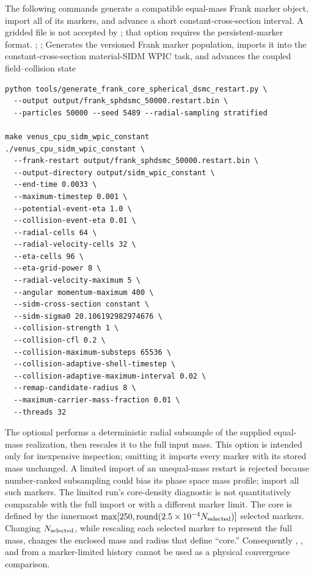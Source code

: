 The following commands generate a compatible equal-mass Frank marker object,
import all of its markers, and advance a short constant-cross-section
interval.  A gridded  file is not accepted by
; that option requires the persistent-marker
 format.
{;
 ;
 }
{Generates the versioned Frank marker population, imports it into the
 constant-cross-section material-SIDM WPIC task, and advances the coupled
 field--collision state}
\begin{lstlisting}
python tools/generate_frank_core_spherical_dsmc_restart.py \
  --output output/frank_sphdsmc_50000.restart.bin \
  --particles 50000 --seed 5489 --radial-sampling stratified

make venus_cpu_sidm_wpic_constant
./venus_cpu_sidm_wpic_constant \
  --frank-restart output/frank_sphdsmc_50000.restart.bin \
  --output-directory output/sidm_wpic_constant \
  --end-time 0.0033 \
  --maximum-timestep 0.001 \
  --potential-event-eta 1.0 \
  --collision-event-eta 0.01 \
  --radial-cells 64 \
  --radial-velocity-cells 32 \
  --eta-cells 96 \
  --eta-grid-power 8 \
  --radial-velocity-maximum 5 \
  --angular momentum-maximum 400 \
  --sidm-cross-section constant \
  --sidm-sigma0 20.106192982974676 \
  --collision-strength 1 \
  --collision-cfl 0.2 \
  --collision-maximum-substeps 65536 \
  --collision-adaptive-shell-timestep \
  --collision-adaptive-maximum-interval 0.02 \
  --remap-candidate-radius 8 \
  --maximum-carrier-mass-fraction 0.01 \
  --threads 32
\end{lstlisting}
The optional  performs a deterministic radial subsample
of the supplied equal-mass realization, then rescales it to
the full input mass.  This option is intended only for inexpensive inspection;
omitting it imports every marker with its
stored mass unchanged.  A limited import of an unequal-mass restart is
rejected because number-ranked subsampling could bias its phase space mass
profile; import all such markers.  The limited run's core-density diagnostic
is not quantitatively comparable with the full import or with a different
marker limit.  The core is defined by the innermost
\(\max[250,\operatorname{round}(2.5\times10^{-4}N_{\rm selected})]\)
selected markers.  Changing \(N_{\rm selected}\), while rescaling each
selected marker to represent the full mass, changes the enclosed mass and
radius that define ``core.''  Consequently ,
\code{core_sigma_r2}, and  from a marker-limited history
cannot be used as a physical convergence comparison.

